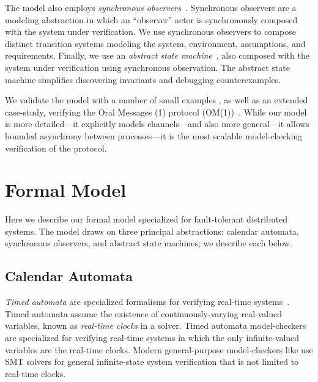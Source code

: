 \documentclass{llncs/llncs}
\newcommand{\lee}[1]{ } %
\newcommand{\lee}[1]{ {\color{blue}$<$lee: #1$>$} } %
\begin{document}
The model also employs \emph{synchronous observers}~\cite{}. Synchronous observers are a modeling abstraction in which an ``observer'' actor is synchronously composed with the system under verification. We use synchronous observers to compose distinct transition systems modeling the system, environment, assumptions, and requirements. Finally, we use an \emph{abstract state machine}~\cite{}, also composed with the system under verification using synchronous observation. The abstract state machine simplifies discovering invariants and debugging counterexamples.

We validate the model with a number of small examples \lee{todo}, as well as an extended case-study, verifying the Oral Messages (1) protocol (OM(1))~\cite{}. While our model is more detailed---it explicitly models channels---and also more general---it allows bounded asynchrony between processes---it is the most scalable model-checking verification of the protocol.

\lee{finish intro...  One more contribution is that we abstract faults using partially interpreted functions in model-checking, which is new? Note focus is on infinite-state model-checking: will need user-provided lemmas. compositional approach to providing lemmas. note verification interesting in its own right }



\section{Formal Model}\label{sec:model}
Here we describe our formal model specialized for fault-tolerant distributed systems. The model draws on three principal abstractions: calendar automata, synchronous observers, and abstract state machines; we describe each below.

\subsection{Calendar Automata}\label{sec:calendar}
\emph{Timed automata} are specialized formalisms for verifying real-time systems~\cite{}. Timed automata assume the existence of continuously-varying real-valued variables, known as \emph{real-time clocks} in a solver. Timed automata model-checkers are specialized for verifying real-time systems in which the only infinite-valued variables are the real-time clocks. Modern general-purpose model-checkers like \lee{name some} use SMT solvers for general infinite-state system verification that is not limited to real-time clocks.
\end{document}
